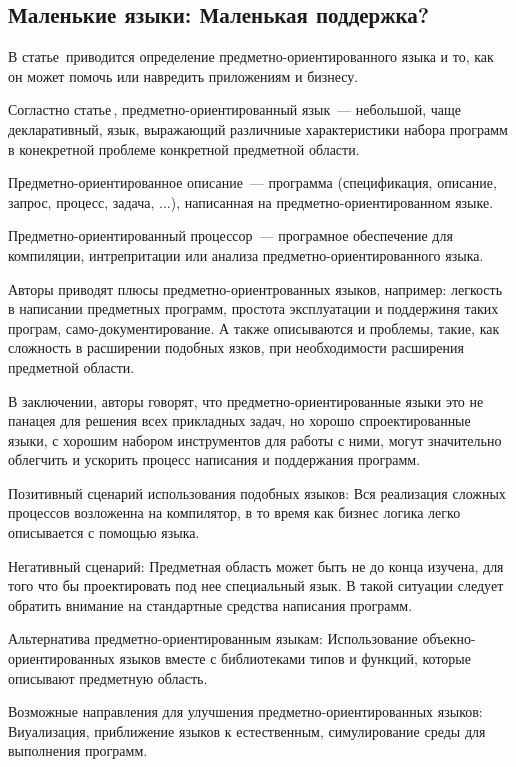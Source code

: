 \subsection{Маленькие языки: Маленькая поддержка?} \label{subsection_Deursen1998}
В статье\,\cite{Deursen1998} приводится определение предметно-ориентированного языка и то, как он может помочь или навредить приложениям и бизнесу. 

Согластно статье\,\cite{Deursen1998}, предметно-ориентированный язык~--- небольшой, чаще декларативный, язык, выражающий различниые характеристики набора программ в конекретной проблеме конкретной предметной области. 

Предметно-ориентированное описание~--- программа (спецификация, описание, запрос, процесс, задача, ...), написанная на предметно-ориентированном языке.

Предметно-ориентированный процессор~--- програмное обеспечение для компиляции, интрепритации или анализа предметно-ориентированного языка.

Авторы приводят плюсы предметно-ориентрованных языков, например: легкость в написании предметных программ, простота эксплуатации и поддержиня таких програм, само-документирование. А также описываются и проблемы, такие, как сложность в расширении подобных язков, при необходимости расширения предметной области. 

В заключении, авторы говорят, что предметно-ориентированные языки это не панацея для решения всех прикладных задач, но хорошо спроектированные языки, с хорошим набором инструментов для работы с ними, могут значительно облегчить и ускорить процесс написания и поддержания программ.

Позитивный сценарий использования подобных языков: Вся реализация сложных процессов возложенна на компилятор, в то время как бизнес логика легко описывается с помощью языка. 

Негативный сценарий: Предметная область может быть не до конца изучена, для того что бы проектировать под нее специальный язык. В такой ситуации следует обратить внимание на стандартные средства написания программ. 

Альтернатива предметно-ориентированным языкам: Использование объекно-ориентированных языков вместе с библиотеками типов и функций, которые описывают предметную область. 

Возможные направления для улучшения предметно-ориентированных языков: Виуализация, приближение языков к естественным, симулирование среды для выполнения программ.

